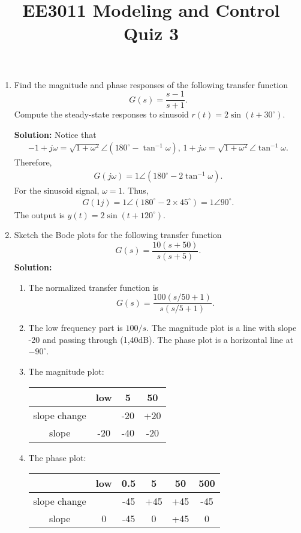 \documentclass{article}
\title{EE3011 Modeling and Control\\Quiz 3}
\date{}
\begin{document}
 \maketitle

\begin{enumerate}
\item Find the magnitude and phase responses of the following transfer function
  \[
    G(s) = \frac{s-1}{s+1}.
  \]
  Compute the steady-state responses to sinusoid $r(t) = 2\sin(t+30^\circ)$.

  {\bf Solution:} Notice that
  \begin{align*}
    -1+j\omega = \sqrt{1+\omega^2}\angle (180^\circ-\tan^{-1}\omega),\,1+j\omega = \sqrt{1+\omega^2}\angle \tan^{-1}\omega.
  \end{align*}
  Therefore,
  \begin{align*}
    G(j\omega) = 1\angle (180^\circ-2\tan^{-1}\omega).
  \end{align*}
  For the sinusoid signal, $\omega = 1$. Thus,
  \begin{align*}
    G(1j) = 1\angle (180^\circ-2\times 45^\circ) = 1\angle 90^\circ.
  \end{align*}
  The output is $y(t) = 2\sin(t+120^\circ)$.


\newpage

\item Sketch the Bode plots for the following transfer function
  \[
    G(s) = \frac{10(s+50)}{s(s+5)}.
  \]
  {\bf Solution:} \begin{enumerate}
  \item The normalized transfer function is
  \[
    G(s) = \frac{100(s/50+1)}{s(s/5+1)}.
  \]
    
\item The low frequency part is $100/s$. The magnitude plot is a line with slope -20 and passing through (1,40dB). The phase plot is a horizontal line at $-90^\circ$.
\item The magnitude plot:
  \begin{table}[h]
    \centering
    \begin{tabular}{c|ccc}
      & low & 5   & 50  \\
      \hline
      slope change &     & -20 & +20 \\
      slope        & -20 & -40 & -20
    \end{tabular}
  \end{table}
\item The phase plot:
  \begin{table}[h]
    \centering
    \begin{tabular}{c|ccccc}
      & low & 0.5 & 5   & 50  & 500 \\
      \hline
      slope change &     & -45 & +45 & +45 & -45 \\
      slope        & 0   & -45 & 0   & +45 & 0  
    \end{tabular}
  \end{table}
\end{enumerate}


\end{enumerate}
\end{document}
